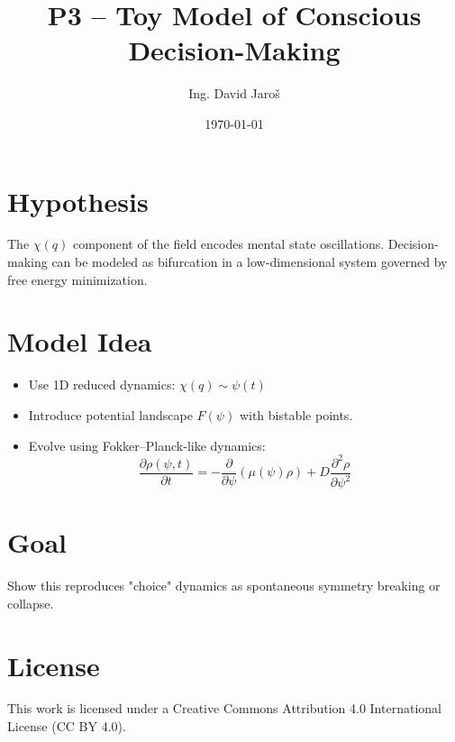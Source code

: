 \documentclass[12pt]{article}
\title{P3 – Toy Model of Conscious Decision-Making}
\author{Ing. David Jaroš}
\date{\today}
\begin{document}
\maketitle


\ConsciousnessDisclaimer

\section*{Hypothesis}
The $\chi(q)$ component of the field encodes mental state oscillations. Decision-making can be modeled as bifurcation in a low-dimensional system governed by free energy minimization.

\section*{Model Idea}
\begin{itemize}
\item Use 1D reduced dynamics: $\chi(q) \sim \psi(t)$
\item Introduce potential landscape $F(\psi)$ with bistable points.
\item Evolve using Fokker–Planck-like dynamics:
\[
\frac{\partial \rho(\psi,t)}{\partial t} = -\frac{\partial}{\partial \psi} \left( \mu(\psi) \rho \right) + D \frac{\partial^2 \rho}{\partial \psi^2}
\]
\end{itemize}

\section*{Goal}
Show this reproduces "choice" dynamics as spontaneous symmetry breaking or collapse.


\section*{License}
This work is licensed under a Creative Commons Attribution 4.0 International License (CC BY 4.0).
\end{document}
